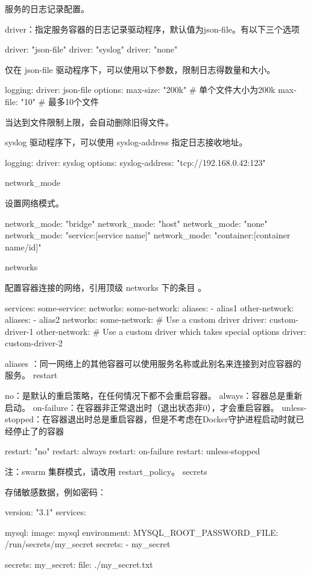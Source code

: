 服务的日志记录配置。

driver：指定服务容器的日志记录驱动程序，默认值为json-file。有以下三个选项

driver: "json-file"
driver: "syslog"
driver: "none"

仅在 json-file 驱动程序下，可以使用以下参数，限制日志得数量和大小。

logging:
  driver: json-file
  options:
    max-size: "200k" # 单个文件大小为200k
    max-file: "10" # 最多10个文件

当达到文件限制上限，会自动删除旧得文件。

syslog 驱动程序下，可以使用 syslog-address 指定日志接收地址。

logging:
  driver: syslog
  options:
    syslog-address: "tcp://192.168.0.42:123"

network_mode

设置网络模式。

network_mode: "bridge"
network_mode: "host"
network_mode: "none"
network_mode: "service:[service name]"
network_mode: "container:[container name/id]"

networks

配置容器连接的网络，引用顶级 networks 下的条目 。

services:
  some-service:
    networks:
      some-network:
        aliases:
         - alias1
      other-network:
        aliases:
         - alias2
networks:
  some-network:
    # Use a custom driver
    driver: custom-driver-1
  other-network:
    # Use a custom driver which takes special options
    driver: custom-driver-2

aliases ：同一网络上的其他容器可以使用服务名称或此别名来连接到对应容器的服务。
restart

    no：是默认的重启策略，在任何情况下都不会重启容器。
    always：容器总是重新启动。
    on-failure：在容器非正常退出时（退出状态非0），才会重启容器。
    unless-stopped：在容器退出时总是重启容器，但是不考虑在Docker守护进程启动时就已经停止了的容器

restart: "no"
restart: always
restart: on-failure
restart: unless-stopped

注：swarm 集群模式，请改用 restart_policy。
secrets

存储敏感数据，例如密码：

version: "3.1"
services:

mysql:
  image: mysql
  environment:
    MYSQL_ROOT_PASSWORD_FILE: /run/secrets/my_secret
  secrets:
    - my_secret

secrets:
  my_secret:
    file: ./my_secret.txt

